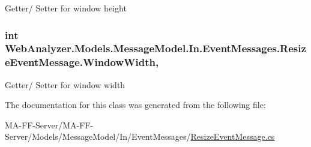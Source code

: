 Getter/ Setter for window height 

\hypertarget{class_web_analyzer_1_1_models_1_1_message_model_1_1_in_1_1_event_messages_1_1_resize_event_message_a71924d047ccc6fbc74445e8a4b291e85}{}
\subsubsection[{Window\+Width}]{\setlength{\rightskip}{0pt plus 5cm}int Web\+Analyzer.\+Models.\+Message\+Model.\+In.\+Event\+Messages.\+Resize\+Event\+Message.\+Window\+Width\hspace{0.3cm}{\ttfamily [get]}, {\ttfamily [set]}}\label{class_web_analyzer_1_1_models_1_1_message_model_1_1_in_1_1_event_messages_1_1_resize_event_message_a71924d047ccc6fbc74445e8a4b291e85}


Getter/ Setter for window width 



The documentation for this class was generated from the following file\+:\begin{DoxyCompactItemize}
\item 
M\+A-\/\+F\+F-\/\+Server/\+M\+A-\/\+F\+F-\/\+Server/\+Models/\+Message\+Model/\+In/\+Event\+Messages/\hyperlink{_resize_event_message_8cs}{Resize\+Event\+Message.\+cs}\end{DoxyCompactItemize}
